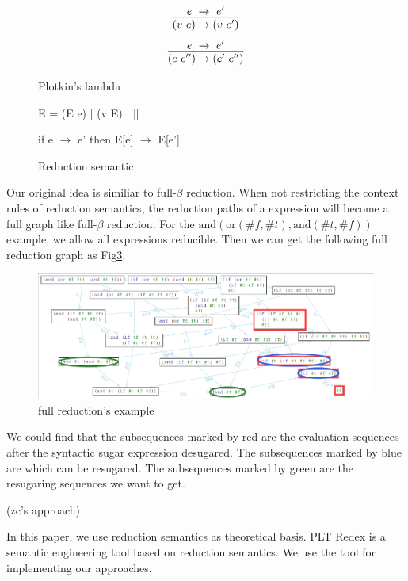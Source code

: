 \begin{figure}[ht]
	\centering
	\[\infer {(v~e) \rightarrow (v~e')}{e~\rightarrow~e'}  \]
	\[\infer {(e~e'') \rightarrow (e'~e'')} {e~\rightarrow~e'}  \]
	\caption{Plotkin's lambda}
	\label{fig:plotkin}
\end{figure} 

\begin{figure}[ht]
	\centering 
	E = (E e) | (v E) | []
	
	if e $\rightarrow$ e' then E[e] $\rightarrow$ E[e']
	\caption{Reduction semantic}
	\label{fig:felleisen}
\end{figure} 

Our original idea is similiar to full-$\beta$ reduction. When not restricting the context rules of reduction semantics, the reduction paths of a expression will become a full graph like full-$\beta$ reduction. For the $\mbox{and}(\mbox{or}(\#f, \#t), \mbox{and}(\#t, \#f))$ example, we allow all expressions reducible. Then we can get the following full reduction graph as Fig\ref{fig:fullreduction}.

\begin{figure}[ht]
	\centering
	\includegraphics[width=12cm]{images/fullreduction.png}
	\caption{full reduction's example}
	\label{fig:fullreduction}
\end{figure}

We could find that the subsequences marked by red are the evaluation sequences after the syntactic sugar expression desugared. The subsequences marked by blue are which can be resugared. The subsequences marked by green are the resugaring sequences we want to get.

(zc's approach)

In this paper, we use reduction semantics as theoretical basis. PLT Redex is a semantic engineering tool based on reduction semantics. We use the tool for implementing our approaches.

